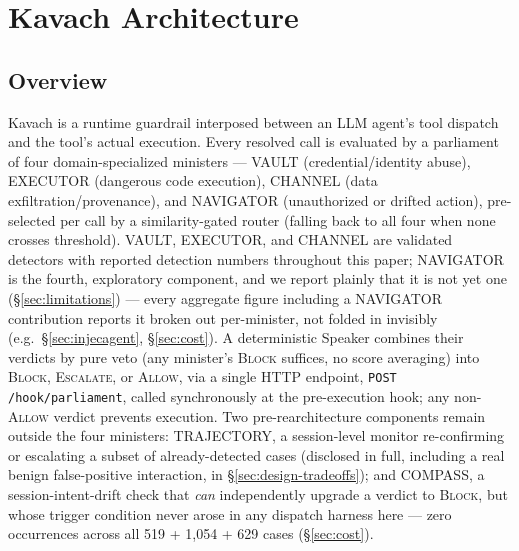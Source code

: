 
\section{Kavach Architecture}
\label{sec:design}
\label{sec:architecture}

\subsection{Overview}

Kavach is a runtime guardrail interposed between an LLM agent's tool
dispatch and the tool's actual execution. Every resolved call is
evaluated by a parliament of four domain-specialized ministers --- VAULT
(credential/identity abuse), EXECUTOR (dangerous code execution), CHANNEL
(data exfiltration/provenance), and NAVIGATOR (unauthorized or drifted
action), pre-selected per call by a similarity-gated router (falling back
to all four when none crosses threshold). VAULT,
EXECUTOR, and CHANNEL are validated detectors with reported detection
numbers throughout this paper; NAVIGATOR is the fourth, exploratory
component, and we report plainly that it is not yet one
(\S\ref{sec:limitations}) --- every aggregate figure including a NAVIGATOR
contribution reports it broken out per-minister, not folded in invisibly
(e.g.\ \S\ref{sec:injecagent}, \S\ref{sec:cost}). A deterministic Speaker
combines their verdicts by pure veto (any minister's \textsc{Block}
suffices, no score averaging) into \textsc{Block}, \textsc{Escalate}, or
\textsc{Allow}, via a single HTTP endpoint,
\texttt{POST /hook\allowbreak/parliament}, called synchronously at the
pre-execution hook; any non-\textsc{Allow} verdict prevents execution. Two
pre-rearchitecture components remain outside the four ministers:
TRAJECTORY, a session-level monitor re-confirming or escalating a subset
of already-detected cases (disclosed in full, including a real benign
false-positive interaction, in \S\ref{sec:design-tradeoffs}); and COMPASS,
a session-intent-drift check that \emph{can} independently upgrade a
verdict to \textsc{Block}, but whose trigger condition never arose in any
dispatch harness here --- zero occurrences across all 519 + 1,054 + 629
cases (\S\ref{sec:cost}).

